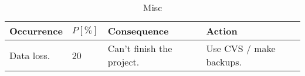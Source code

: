 \begin{longtable}{|X|p{1.2cm}|X|X|}
	\caption[]{\label{tab:riskListMisc} Misc}\\
    \hline
    \textbf{Occurrence} &
    \textbf{$P [\%]$} &
    \textbf{Consequence} &
    \textbf{Action} \\
    \hline
    \hline
	Data loss. &
	20 &
	Can't finish the project. &
	Use CVS / make backups. \\
	\hline
\end{longtable}
